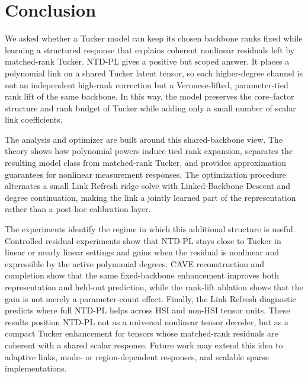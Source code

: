\section{Conclusion}

We asked whether a Tucker model can keep its chosen backbone ranks fixed while learning a
structured response that explains coherent nonlinear residuals left by matched-rank Tucker.
NTD-PL gives a positive but scoped answer. It places a polynomial link on a shared Tucker
latent tensor, so each higher-degree channel is not an independent high-rank correction but a
Veronese-lifted, parameter-tied rank lift of the same backbone. In this way, the model preserves
the core--factor structure and rank budget of Tucker while adding only a small number of scalar
link coefficients.

The analysis and optimizer are built around this shared-backbone view. The theory shows how
polynomial powers induce tied rank expansion, separates the resulting model class from
matched-rank Tucker, and provides approximation guarantees for nonlinear measurement
responses. The optimization procedure alternates a small Link Refresh ridge solve with
Linked-Backbone Descent and degree continuation, making the link a jointly learned part of
the representation rather than a post-hoc calibration layer.

The experiments identify the regime in which this additional structure is useful. Controlled
residual experiments show that NTD-PL stays close to Tucker in linear or nearly linear settings
and gains when the residual is nonlinear and expressible by the active polynomial degrees.
CAVE reconstruction and completion show that the same fixed-backbone enhancement improves
both representation and held-out prediction, while the rank-lift ablation shows that the gain is
not merely a parameter-count effect. Finally, the Link Refresh diagnostic predicts where full
NTD-PL helps across HSI and non-HSI tensor units. These results position NTD-PL not as a
universal nonlinear tensor decoder, but as a compact Tucker enhancement for tensors whose
matched-rank residuals are coherent with a shared scalar response. Future work may extend this
idea to adaptive links, mode- or region-dependent responses, and scalable sparse implementations.
